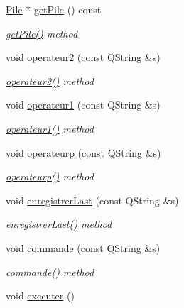 \begin{DoxyCompactItemize}
\hyperlink{class_pile}{Pile} $\ast$ \hyperlink{class_calculatrice_ae2d0c9c7d1d378d65d1cab56124d29c8}{get\+Pile} () const 
\begin{DoxyCompactList}\small\item\em \hyperlink{class_calculatrice_ae2d0c9c7d1d378d65d1cab56124d29c8}{get\+Pile()} method \end{DoxyCompactList}\item 
void \hyperlink{class_calculatrice_a48c8aa03ff4562c5794a62e4e485fc39}{operateur2} (const Q\+String \&s)
\begin{DoxyCompactList}\small\item\em \hyperlink{class_calculatrice_a48c8aa03ff4562c5794a62e4e485fc39}{operateur2()} method \end{DoxyCompactList}\item 
void \hyperlink{class_calculatrice_ae82762b5bb2cadd28af3534353ce0431}{operateur1} (const Q\+String \&s)
\begin{DoxyCompactList}\small\item\em \hyperlink{class_calculatrice_ae82762b5bb2cadd28af3534353ce0431}{operateur1()} method \end{DoxyCompactList}\item 
void \hyperlink{class_calculatrice_a567873272e220894b3ddc5909c20b0a7}{operateurp} (const Q\+String \&s)
\begin{DoxyCompactList}\small\item\em \hyperlink{class_calculatrice_a567873272e220894b3ddc5909c20b0a7}{operateurp()} method \end{DoxyCompactList}\item 
void \hyperlink{class_calculatrice_aeda02ec9d861a66f67d75757db227504}{enregistrer\+Last} (const Q\+String \&s)
\begin{DoxyCompactList}\small\item\em \hyperlink{class_calculatrice_aeda02ec9d861a66f67d75757db227504}{enregistrer\+Last()} method \end{DoxyCompactList}\item 
void \hyperlink{class_calculatrice_ae96458c336f6b14ead0ae2086828d9bb}{commande} (const Q\+String \&s)
\begin{DoxyCompactList}\small\item\em \hyperlink{class_calculatrice_ae96458c336f6b14ead0ae2086828d9bb}{commande()} method \end{DoxyCompactList}\item 
void \hyperlink{class_calculatrice_a18952ea12781a4b3ca6147ff10298db7}{executer} ()

\end{DoxyCompactItemize}
